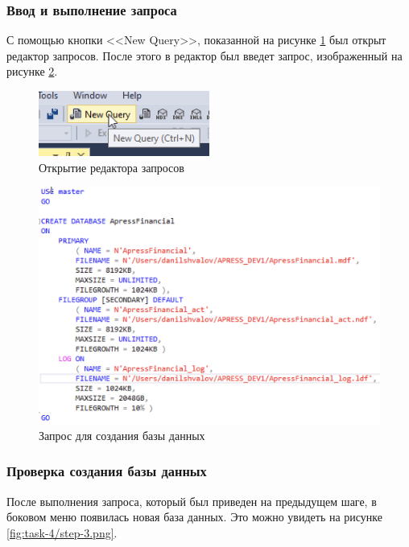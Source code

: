 \documentclass[a4paper, 14pt]{extarticle}
\begin{document}
\subsubsection{Ввод и выполнение запроса}

С помощью кнопки <<New Query>>, показанной на рисунке
\ref{fig:task-4/step-1.png} был открыт редактор запросов. После этого в редактор
был введет запрос, изображенный на рисунке \ref{fig:task-4/step-2.png}.

\begin{figure}[H]
  \centering
  \includegraphics[width=0.5\textwidth]{images/task-4/step-1.png}
  \caption{Открытие редактора запросов}
  \label{fig:task-4/step-1.png}
\end{figure}

\begin{figure}[H]
  \centering
  \includegraphics[width=\textwidth]{images/task-4/step-2.png}
  \caption{Запрос для создания базы данных}
  \label{fig:task-4/step-2.png}
\end{figure}

\subsubsection{Проверка создания базы данных}

После выполнения запроса, который был приведен на предыдущем шаге, в боковом
меню появилась новая база данных. Это можно увидеть на рисунке
\ref{fig:task-4/step-3.png}.
\end{document}
